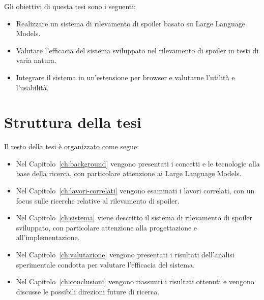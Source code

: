 Gli obiettivi di questa tesi sono i seguenti:

\begin{itemize}
  \item Realizzare un sistema di rilevamento di spoiler
        basato su Large Language Models.
  \item Valutare l'efficacia del sistema sviluppato nel
        rilevamento di spoiler in testi di varia natura.
  \item Integrare il sistema in un'estensione per browser
        e valutarne l'utilità e l'usabilità.
\end{itemize}

\section{Struttura della tesi}
\label{sec:struttura-tesi}

Il resto della tesi è organizzato come segue:

\begin{itemize}
  \item Nel Capitolo~\ref{ch:background} vengono
        presentati i concetti e le tecnologie alla base
        della ricerca, con particolare attenzione ai Large
        Language Models.
  \item Nel Capitolo~\ref{ch:lavori-correlati} vengono
        esaminati i lavori correlati, con un focus sulle
        ricerche relative al rilevamento di spoiler.
  \item Nel Capitolo~\ref{ch:sistema} viene descritto il
        sistema di rilevamento di spoiler sviluppato, con
        particolare attenzione alla progettazione e
        all'implementazione.
  \item Nel Capitolo~\ref{ch:valutazione} vengono
        presentati i risultati dell'analisi sperimentale
        condotta per valutare l'efficacia del sistema.
  \item Nel Capitolo~\ref{ch:conclusioni} vengono
        riassunti i risultati ottenuti e vengono discusse
        le possibili direzioni future di ricerca.
\end{itemize}

